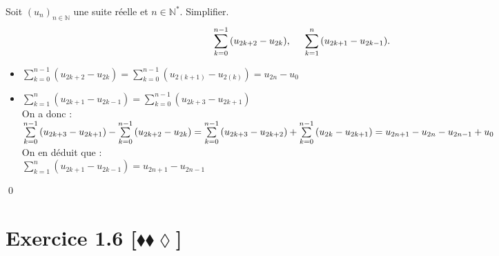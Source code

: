 \documentclass[10pt]{article}
\begin{document}
\begin{tcolorbox}[enhanced, width=7in, center, size=fbox, fontupper=\large, drop shadow southwest]
    Soit $(u_n)_{n\in\mathbb{N}}$ une suite réelle et $n\in\mathbb{N}^*$. Simplifier.
    \begin{equation*}
        \sum\limits^{n-1}_{k=0}{(u_{2k+2}-u_{2k})}, \hspace{0.5cm} \sum\limits^{n}_{k=1}{(u_{2k+1}-u_{2k-1})}.
    \end{equation*}
    \begin{itemize}
        \item $\sum\limits^{n-1}_{k=0}{(u_{2k+2}-u_{2k})}=\sum\limits^{n-1}_{k=0}{(u_{2(k+1)}-u_{2(k)})}=u_{2n}-u_0$
        \item $\sum\limits^{n}_{k=1}{(u_{2k+1}-u_{2k-1})}=\sum\limits^{n-1}_{k=0}{(u_{2k+3}-u_{2k+1})}$\\On a donc :\\$\sum\limits^{n-1}_{k=0}{(u_{2k+3}-u_{2k+1})}-\sum\limits^{n-1}_{k=0}{(u_{2k+2}-u_{2k})}\\=\sum\limits^{n-1}_{k=0}{(u_{2k+3}-u_{2k+2})} + \sum\limits^{n-1}_{k=0}{(u_{2k}-u_{2k+1})}\\=u_{2n+1}-u_{2n}-u_{2n-1}+u_{0}$\\On en déduit que :\\$\sum\limits^{n}_{k=1}{(u_{2k+1}-u_{2k-1})}=u_{2n+1}-u_{2n-1}$
    \end{itemize}
    \qed
\end{tcolorbox}


\section*{Exercice 1.6 [$\blacklozenge\blacklozenge\lozenge$]}
\end{document}
